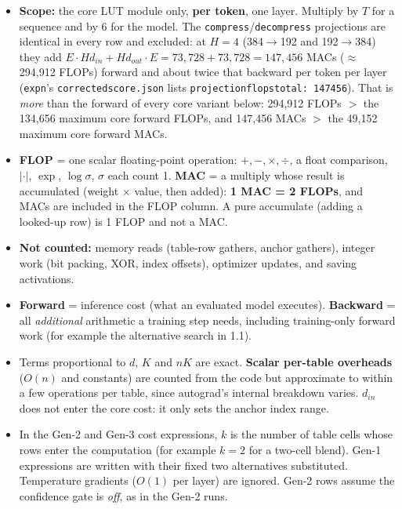 \documentclass[10pt]{article}
\newcommand{\code}[1]{{\renewcommand{\_}{\textunderscore\allowbreak}\texttt{#1}}}
\begin{document}
\begin{itemize}\setlength\itemsep{1pt}
\item \textbf{Scope:} the core LUT module only, \textbf{per token}, one layer. Multiply by $T$ for a sequence and by 6 for the
  model. The \code{compress}/\code{decompress} projections are identical in every row and excluded: at $H=4$ (384$\to$192 and 192$\to$384) they add
  $E\cdot Hd_{in}+Hd_{out}\cdot E=73{,}728+73{,}728=147{,}456$ MACs ($\approx$\,294,912 FLOPs) forward and about twice that backward per token per
  layer (\code{exp\_n\_0121}'s \code{corrected\_score.json} lists \code{projection\_flops\_total: 147456}). That is \emph{more} than the forward of every core variant below:
  294,912 FLOPs $>$ the 134,656 maximum core forward FLOPs, and 147,456 MACs $>$ the 49,152 maximum core forward MACs.
\item \textbf{FLOP} = one scalar floating-point operation: $+,-,\times,\div$, a float comparison, $|\cdot|$, $\exp$, $\log\sigma$,
  $\sigma$ each count 1. \textbf{MAC} = a multiply whose result is accumulated (weight $\times$ value, then added):
  \textbf{1 MAC = 2 FLOPs}, and MACs are included in the FLOP column. A pure accumulate (adding a looked-up row) is 1 FLOP and not a MAC.
\item \textbf{Not counted:} memory reads (table-row gathers, anchor gathers), integer work (bit packing, XOR, index offsets),
  optimizer updates, and saving activations.
\item \textbf{Forward} = inference cost (what an evaluated model executes). \textbf{Backward} = all \emph{additional}
  arithmetic a training step needs, including training-only forward work (for example the alternative search in 1.1).
\item Terms proportional to $d$, $K$ and $nK$ are exact. \textbf{Scalar per-table overheads} ($O(n)$ and constants) are
  counted from the code but approximate to within a few operations per table, since autograd's internal breakdown varies.
  $d_{in}$ does not enter the core cost: it only sets the anchor index range.
\item In the Gen-2 and Gen-3 cost expressions, $k$ is the number of table cells whose rows enter the computation (for example $k=2$ for a two-cell blend).
  Gen-1 expressions are written with their fixed two alternatives substituted. Temperature gradients ($O(1)$ per layer) are ignored. Gen-2 rows assume the confidence gate is \emph{off}, as in the Gen-2 runs.
\end{itemize}
\end{document}
